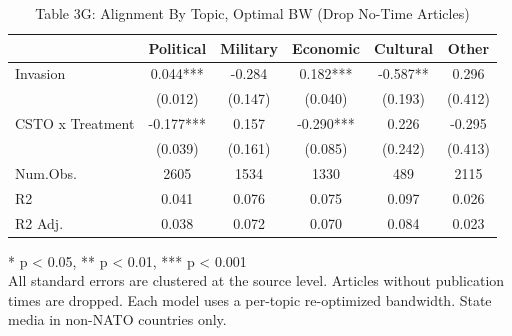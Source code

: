 \begin{table}[!t]
\caption{Table 3G: Alignment By Topic, Optimal BW (Drop No-Time Articles)} 
\fontsize{12.0pt}{14.4pt}\selectfont
\begin{tabular*}{\linewidth}{@{\extracolsep{\fill}}lccccc}
\toprule
  & Political & Military & Economic & Cultural & Other \\ 
\midrule\addlinespace[2.5pt]
Invasion & 0.044*** & -0.284 & 0.182*** & -0.587** & 0.296 \\ 
 & (0.012) & (0.147) & (0.040) & (0.193) & (0.412) \\ 
CSTO x Treatment & -0.177*** & 0.157 & -0.290*** & 0.226 & -0.295 \\ 
{} & {(0.039)} & {(0.161)} & {(0.085)} & {(0.242)} & {(0.413)} \\ 
Num.Obs. & 2605 & 1534 & 1330 & 489 & 2115 \\ 
R2 & 0.041 & 0.076 & 0.075 & 0.097 & 0.026 \\ 
R2 Adj. & 0.038 & 0.072 & 0.070 & 0.084 & 0.023 \\ 
\bottomrule
\end{tabular*}
\begin{minipage}{\linewidth}
* p < 0.05, ** p < 0.01, *** p < 0.001\\
All standard errors are clustered at the source level. Articles without
publication times are dropped. Each model uses a per-topic re-optimized
bandwidth. State media in non-NATO countries only.\\
\end{minipage}
\end{table}

